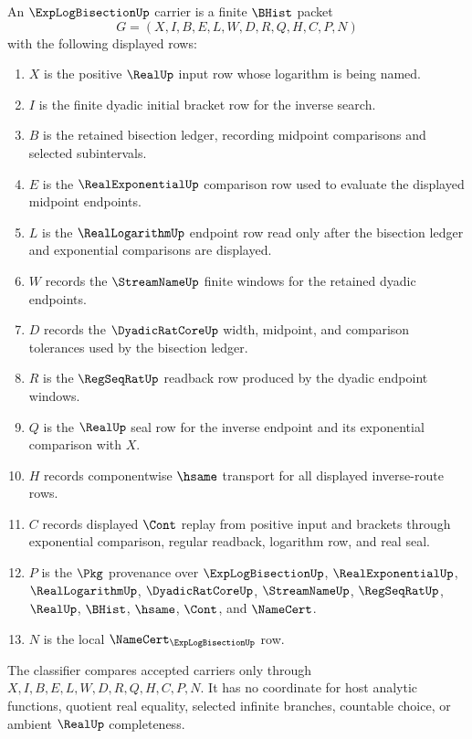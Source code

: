 \begin{definition}
\label{def:exp-log-bisection-carrier}
An $\ExpLogBisectionUp$ carrier is a finite $\BHist$ packet
$$
G=(X,I,B,E,L,W,D,R,Q,H,C,P,N)
$$
with the following displayed rows:
\begin{enumerate}
\item $X$ is the positive $\RealUp$ input row whose logarithm is being named.
\item $I$ is the finite dyadic initial bracket row for the inverse search.
\item $B$ is the retained bisection ledger, recording midpoint comparisons and selected subintervals.
\item $E$ is the $\RealExponentialUp$ comparison row used to evaluate the displayed midpoint endpoints.
\item $L$ is the $\RealLogarithmUp$ endpoint row read only after the bisection ledger and exponential comparisons are displayed.
\item $W$ records the $\StreamNameUp$ finite windows for the retained dyadic endpoints.
\item $D$ records the $\DyadicRatCoreUp$ width, midpoint, and comparison tolerances used by the bisection ledger.
\item $R$ is the $\RegSeqRatUp$ readback row produced by the dyadic endpoint windows.
\item $Q$ is the $\RealUp$ seal row for the inverse endpoint and its exponential comparison with $X$.
\item $H$ records componentwise $\hsame$ transport for all displayed inverse-route rows.
\item $C$ records displayed $\Cont$ replay from positive input and brackets through exponential comparison, regular readback, logarithm row, and real seal.
\item $P$ is the $\Pkg$ provenance over $\ExpLogBisectionUp$, $\RealExponentialUp$, $\RealLogarithmUp$, $\DyadicRatCoreUp$, $\StreamNameUp$, $\RegSeqRatUp$, $\RealUp$, $\BHist$, $\hsame$, $\Cont$, and $\NameCert$.
\item $N$ is the local $\NameCert_{\ExpLogBisectionUp}$ row.
\end{enumerate}
The classifier compares accepted carriers only through $X,I,B,E,L,W,D,R,Q,H,C,P,N$. It has no coordinate for host analytic functions, quotient real equality, selected infinite branches, countable choice, or ambient $\RealUp$ completeness.
\end{definition}

